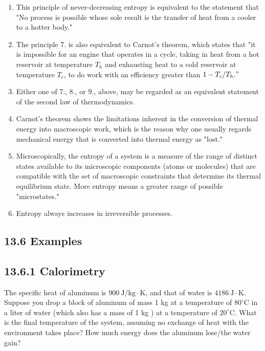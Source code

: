 \documentclass[10pt]{article}
\begin{document}
\begin{enumerate}
  \item This principle of never-decreasing entropy is equivalent to the statement that "No process is possible whose sole result is the transfer of heat from a cooler to a hotter body."
  \item The principle 7. is also equivalent to Carnot's theorem, which states that "it is impossible for an engine that operates in a cycle, taking in heat from a hot reservoir at temperature $T_{h}$ and exhausting heat to a cold reservoir at temperature $T_{c}$, to do work with an efficiency greater than $1-T_{c} / T_{h} . "$
  \item Either one of 7., 8., or 9., above, may be regarded as an equivalent statement of the second law of thermodynamics.
  \item Carnot's theorem shows the limitations inherent in the conversion of thermal energy into macroscopic work, which is the reason why one usually regards mechanical energy that is converted into thermal energy as "lost."
  \item Microscopically, the entropy of a system is a measure of the range of distinct states available to its microscopic components (atoms or molecules) that are compatible with the set of macroscopic constraints that determine its thermal equilibrium state. More entropy means a greater range of possible "microstates."
  \item Entropy always increases in irreversible processes.
\end{enumerate}

\subsection*{13.6 Examples}
\subsection*{13.6.1 Calorimetry}
The specific heat of aluminum is $900 \mathrm{~J} / \mathrm{kg} \cdot \mathrm{K}$, and that of water is $4186 \mathrm{~J} \cdot \mathrm{K}$. Suppose you drop a block of aluminum of mass 1 kg at a temperature of $80^{\circ} \mathrm{C}$ in a liter of water (which also has a mass of 1 kg ) at a temperature of $20^{\circ} \mathrm{C}$. What is the final temperature of the system, assuming no exchange of heat with the environment takes place? How much energy does the aluminum lose/the water gain?
\end{document}
